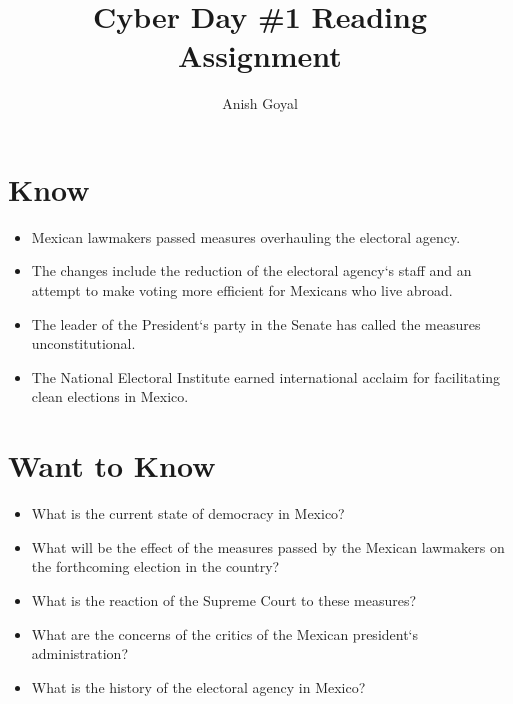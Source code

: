 \documentclass[stu]{apa7}
\title{Cyber Day \#1 Reading Assignment}
\author{Anish Goyal}
\newenvironment{threecolumns}{
  \begin{multicols}{3}
  \setlength{\columnsep}{1.5cm}
}{
  \end{multicols}
}
\begin{document}
\maketitle

\begin{threecolumns}
    \section{Know}
    \begin{itemize}
    \item Mexican lawmakers passed measures overhauling the electoral agency. 
    \item The changes include the reduction of the electoral agency`s staff and an attempt to make voting more efficient for Mexicans who live abroad.
    \item The leader of the President`s party in the Senate has called the measures unconstitutional.
    \item The National Electoral Institute earned international acclaim for facilitating clean elections in Mexico.
    \end{itemize}
        
    \section{Want to Know}
    \begin{itemize}
    \item What is the current state of democracy in Mexico?
    \item What will be the effect of the measures passed by the Mexican lawmakers on the forthcoming election in the country?
    \item What is the reaction of the Supreme Court to these measures?
    \item What are the concerns of the critics of the Mexican president`s administration? 
    \item What is the history of the electoral agency in Mexico?
    \end{itemize}


\end{threecolumns}
\end{document}
